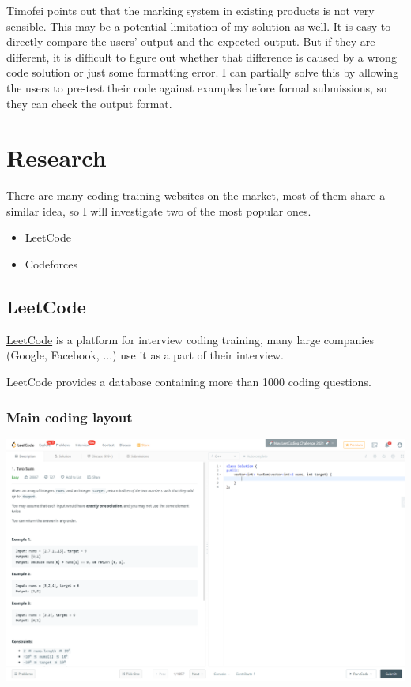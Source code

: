 \documentclass[a4paper]{report}
\begin{document}
Timofei points out that the marking system in existing products is not very sensible. This may be a potential limitation of my solution as well. It is easy to directly compare the users' output and the expected output. But if they are different, it is difficult to figure out whether that difference is caused by a wrong code solution or just some formatting error. I can partially solve this by allowing the users to pre-test their code against examples before formal submissions, so they can check the output format. 

\section{Research}

There are many coding training websites on the market, most of them share a similar idea, so I will investigate two of the most popular ones.

\begin{itemize}
    \item LeetCode
    \item Codeforces
\end{itemize}

\subsection{LeetCode}

\href{https://leetcode.com/}{LeetCode} is a platform for interview coding training, many large companies (Google, Facebook, ...) use it as a part of their interview.

LeetCode provides a database containing more than 1000 coding questions.

\subsubsection{Main coding layout}
\includegraphics[width=\linewidth]{Two-Sum-LeetCode-Coding}
\end{document}
